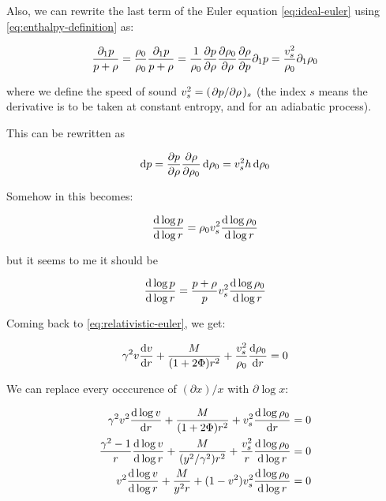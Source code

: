 \documentclass[main.tex]{subfiles}
\begin{document}
Also, we can rewrite the last term of the Euler equation \eqref{eq:ideal-euler} using \eqref{eq:enthalpy-definition}  as:

\begin{equation}
  \frac{\partial_1 p}{p + \rho} =
  \frac{\rho_0}{\rho_0} \frac{\partial_1 p}{p + \rho} =
  \frac{1}{\rho_0} \pdv{p}{\rho} \pdv{\rho_0}{\rho}
  \pdv{\rho}{p}   \partial_1 p =
  \frac{v_s^2}{\rho_0} \partial_1\rho_0
\end{equation}

where we define the speed of sound \(v_s^2 = (\pdv*{p}{\rho})_s\) (the index \(s\) means the derivative is to be taken at constant entropy, and for an adiabatic process).

This can be rewritten as

\begin{equation}
  \dd{p} = \pdv{p}{\rho} \pdv{\rho}{\rho_0} \dd{\rho_0} = v_s^2 h \dd{\rho_0}
\end{equation}

\begin{greenbox}
  Somehow in \cite[page 175]{Nobili:2000} this becomes:

  \begin{equation}
    \dv{\log p }{\log r} = \rho_0 v_s^2 \dv{\log \rho_0}{\log r }
  \end{equation}

  but it seems to me it should be

  \begin{equation}
  \dv{\log p }{\log r} = \frac{p+\rho}{p} v_s^2 \dv{\log \rho_0}{\log r }
  \end{equation}
\end{greenbox}

Coming back to \eqref{eq:relativistic-euler},  we get:

\begin{equation}
  \gamma^2 v \dv{v}{r} + \frac{M}{(1+ 2 \Phi) r^2}
  + \frac{v_s^2 }{\rho_0}\dv{\rho_0}{r} = 0
\end{equation}

We can replace every occcurence of \((\partial x) / x \) with \(\partial \log x \):

\begin{subequations}
\begin{align}
  \gamma^2 v^2 \dv{\log v}{r} + \frac{M}{(1+ 2 \Phi) r^2} + v_s^2 \dv{\log \rho_0}{r}  &= 0 \\
  \frac{\gamma^2 - 1}{r}  \dv{\log v}{\log r} + \frac{M}{(y^2/\gamma^2) r^2}
  + \frac{v_s^2}{r} \dv{\log \rho_0}{\log r}  &= 0  \\
  v^2  \dv{\log v}{\log r} + \frac{M}{y^2 r}
  + (1-v^2) v_s^2 \dv{\log \rho_0}{\log r}  &= 0
\end{align}
\end{subequations}
\end{document}
